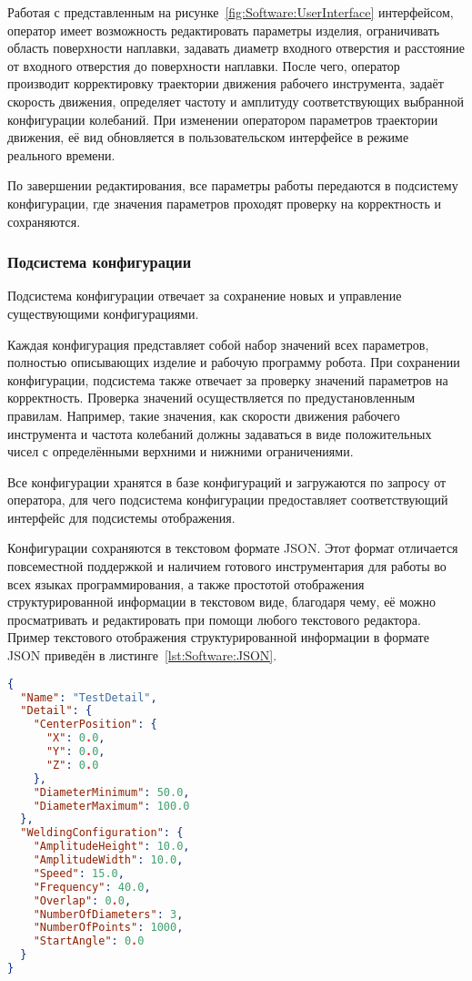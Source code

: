 Работая с представленным на рисунке~\ref{fig:Software:UserInterface} интерфейсом, оператор имеет возможность редактировать параметры изделия, ограничивать область поверхности наплавки, задавать диаметр входного отверстия и расстояние от входного отверстия до поверхности наплавки.
После чего, оператор производит корректировку траектории движения рабочего инструмента, задаёт скорость движения, определяет частоту и амплитуду соответствующих выбранной конфигурации колебаний.
При изменении оператором параметров траектории движения, её вид обновляется в пользовательском интерфейсе в режиме реального времени.

По завершении редактирования, все параметры работы передаются в подсистему конфигурации, где значения параметров проходят проверку на корректность и сохраняются.

\subsubsection*{Подсистема конфигурации}
Подсистема конфигурации отвечает за сохранение новых и управление существующими конфигурациями.

Каждая конфигурация представляет собой набор значений всех параметров, полностью описывающих изделие и рабочую программу робота.
При сохранении конфигурации, подсистема также отвечает за проверку значений параметров на корректность.
Проверка значений осуществляется по предустановленным правилам.
Например, такие значения, как скорости движения рабочего инструмента и частота колебаний должны задаваться в виде положительных чисел с определёнными верхними и нижними ограничениями.

Все конфигурации хранятся в базе конфигураций и загружаются по запросу от оператора, для чего подсистема конфигурации предоставляет соответствующий интерфейс для подсистемы отображения.

Конфигурации сохраняются в текстовом формате JSON.
Этот формат отличается повсеместной поддержкой и наличием готового инструментария для работы во всех языках программирования, а также простотой отображения структурированной информации в текстовом виде, благодаря чему, её можно просматривать и редактировать при помощи любого текстового редактора.
Пример текстового отображения структурированной информации в формате JSON приведён в листинге~\ref{lst:Software:JSON}. \newpage

\begin{lstlisting}[language={json}, caption={Текстовое отображение информации в формате JSON}, label={lst:Software:JSON}]
{
  "Name": "TestDetail",
  "Detail": {
    "CenterPosition": {
      "X": 0.0,
      "Y": 0.0,
      "Z": 0.0
    },
    "DiameterMinimum": 50.0,
    "DiameterMaximum": 100.0
  },
  "WeldingConfiguration": {
    "AmplitudeHeight": 10.0,
    "AmplitudeWidth": 10.0,
    "Speed": 15.0,
    "Frequency": 40.0,
    "Overlap": 0.0,
    "NumberOfDiameters": 3,
    "NumberOfPoints": 1000,
    "StartAngle": 0.0
  }
}
\end{lstlisting}


